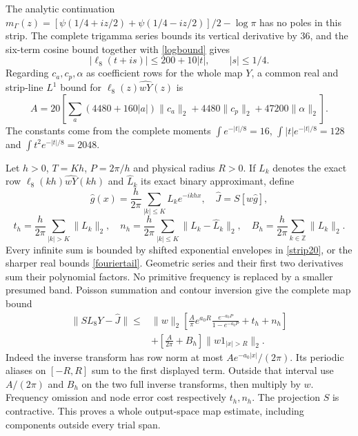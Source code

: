 \documentclass[11pt]{article}
\numberwithin{equation}{section}
\begin{document}
The analytic continuation
$m_\Gamma(z)=[\psi(1/4+iz/2)+\psi(1/4-iz/2)]/2-\log\pi$
has no poles in this strip. The complete trigamma series bounds its
vertical derivative by $36$, and the six-term cosine bound together
with \eqref{logbound} gives
\[
 |\ell_8(t+is)|\le200+10|t|,\qquad |s|\le1/4.
\]
Regarding $c_a,c_p,\alpha$ as coefficient rows for the whole map $Y$,
a common real and strip-line $L^1$ bound for
$\ell_8(z)\widehat{wY}(z)$ is
\begin{equation}\label{envelopeA}
 A=20\left[\sum_a(4480+160|a|)\|c_a\|_2
                +4480\|c_p\|_2+47200\|\alpha\|_2\right].
\end{equation}
The constants come from the complete moments
$\int e^{-|t|/8}=16$, $\int|t|e^{-|t|/8}=128$ and
$\int t^2e^{-|t|/8}=2048$.

Let $h>0$, $T=Kh$, $P=2\pi/h$ and physical radius $R>0$.
If $L_k$ denotes the exact row
$\ell_8(kh)\widehat{wY}(kh)$ and $\widehat L_k$ its exact binary
approximant, define
\[
 \widehat g(x)=\frac h{2\pi}\sum_{|k|\le K}\widehat L_ke^{-ikhx},
 \quad\widehat J=S[w\widehat g],
\]
\[
 t_h=\frac h{2\pi}\sum_{|k|>K}\|L_k\|_2,\quad
 n_h=\frac h{2\pi}\sum_{|k|\le K}\|L_k-\widehat L_k\|_2,
 \quad B_h=\frac h{2\pi}\sum_{k\in\mathbb Z}\|L_k\|_2.
\]
Every infinite sum is bounded by shifted exponential envelopes in
\eqref{strip20}, or the sharper real bounds \eqref{fouriertail}.
Geometric series and their first two derivatives sum their polynomial
factors. No primitive frequency is replaced by a smaller presumed band.
Poisson summation and contour inversion give the complete map bound
\begin{align}\label{actionbound}
 \|SL_8Y-\widehat J\|\le{}&\|w\|_2
 \left[\frac A\pi e^{a_0R}
 \frac{e^{-a_0P}}{1-e^{-a_0P}}+t_h+n_h\right]\\
 &+\left[\frac A{2\pi}+B_h\right]
                      \|w1_{|x|>R}\|_2.\nonumber
\end{align}
Indeed the inverse transform has row norm at most
$Ae^{-a_0|x|}/(2\pi)$. Its periodic aliases on $[-R,R]$ sum to
the first displayed term. Outside that interval use $A/(2\pi)$
and $B_h$ on the two full inverse transforms, then multiply by $w$.
Frequency omission and node error cost respectively $t_h,n_h$.
The projection $S$ is contractive. This proves a whole output-space
map estimate, including components outside every trial span.
\end{document}
